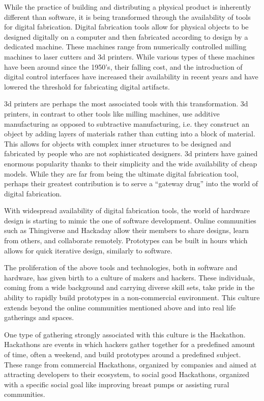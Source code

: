 While the practice of building and distributing a physical product is inherently different than software, it is being transformed through the availability of tools for digital fabrication. Digital fabrication tools allow for physical objects to be designed digitally on a computer and then fabricated according to design by a dedicated machine. These machines range from numerically controlled milling machines to laser cutters and 3d printers. While various types of these machines have been around since the 1950's, their falling cost, and the introduction of digital control interfaces have increased their availability in recent years and have lowered the threshold for fabricating digital artifacts.

3d printers are perhaps the most associated tools with this transformation. 3d printers, in contrast to other tools like milling machines, use additive manufacturing as opposed to subtractive manufacturing, i.e. they construct an object by adding layers of materials rather than cutting into a block of material. This allows for objects with complex inner structures to be designed and fabricated by people who are not sophisticated designers. 3d printers have gained enormous popularity thanks to their simplicity and the wide availability of cheap models. While they are far from being the ultimate digital fabrication tool, perhaps their greatest contribution is to serve a ``gateway drug'' into the world of digital fabrication. 

With widespread availability of digital fabrication tools, the world of hardware design is starting to mimic the one of software development. Online communities such as Thingiverse\cite{thingverse} and Hackaday\cite{hackaday} allow their members to share designs, learn from others, and collaborate remotely. Prototypes can be built in hours which allows for quick iterative design, similarly to software. 

The proliferation of the above tools and technologies, both in software and hardware, has given birth to a culture of makers and hackers. These individuals, coming from a wide background and carrying diverse skill sets, take pride in the ability to rapidly build prototypes in a non-commercial environment. This culture extends beyond the online communities mentioned above and into real life gatherings and spaces. 

One type of gathering strongly associated with this culture is the Hackathon. Hackathons are events in which hackers gather together for a predefined amount of time, often a weekend, and build prototypes around a predefined subject. These range from commercial Hackathons, organized by companies and aimed at attracting developers to their ecosystem, to social good Hackathons, organized with a specific social goal like improving breast pumps\cite{d2016feminist} or assisting rural communities\cite{hackforwestmass}.   

